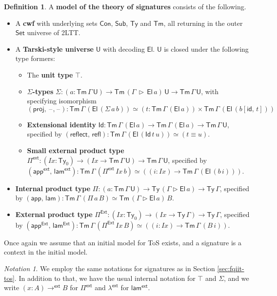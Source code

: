 \documentclass[12pt,a4paper,twoside,openany]{book}
\theoremstyle{remark}
\newtheorem{notation}{Notation}
\theoremstyle{definition}
\newtheorem{mydefinition}{Definition}
\theoremstyle{theorem}
\newcommand{\mi}[1]{\mathit{#1}}
\newcommand{\ms}[1]{\mathsf{#1}}
\newcommand{\refl}{\mathsf{refl}}
\newcommand{\reflect}{\mathsf{reflect}}
\newcommand{\id}{\mathsf{id}}
\newcommand{\Con}{\mathsf{Con}}
\newcommand{\Sub}{\mathsf{Sub}}
\newcommand{\Tm}{\mathsf{Tm}}
\newcommand{\Ty}{\mathsf{Ty}}
\newcommand{\U}{\mathsf{U}}
\newcommand{\El}{\mathsf{El}}
\newcommand{\Id}{\mathsf{Id}}
\newcommand{\proj}{\mathsf{proj}}
\newcommand{\blank}{\mathord{\hspace{1pt}\text{--}\hspace{1pt}}}
\newcommand{\Set}{\mathsf{Set}}
\newcommand{\ext}{\triangleright}
\newcommand{\Pie}{\Pi^{\mathsf{Ext}}}
\newcommand{\appe}{\mathsf{app^{Ext}}}
\newcommand{\lame}{\mathsf{lam^{Ext}}}
\newcommand{\Piinf}{\Pi^{\mathsf{ext}}}
\newcommand{\appinf}{\mathsf{app^{ext}}}
\newcommand{\laminf}{\mathsf{lam^{ext}}}
\newcommand{\toinf}{\to^{\ms{ext}}}
\newcommand{\lambdainf}{\lambda^{\ms{ext}}}
\newcommand{\app}{\ms{app}}
\newcommand{\lam}{\ms{lam}}
\begin{document}
\begin{mydefinition}
\label{def:iqiit-tos}
A \textbf{model of the theory of signatures} consists of the following.
  \begin{itemize}
    \item A \textbf{cwf} with underlying sets $\Con$, $\Sub$, $\Ty$ and $\Tm$, all returning in
      the outer $\Set$ universe of 2LTT.
    \item A \textbf{Tarski-style universe} $\U$ with decoding $\El$. $\U$ is closed under the following type formers:
      \begin{itemize}
        \item The \textbf{unit type} $\top$.
        \item \textbf{$\Sigma$-types} $\Sigma : (a : \Tm\,\Gamma\,\U) \to \Tm\,(\Gamma\,\ext\,\El\,a)\,\U \to \Tm\,\Gamma\,\U$, with specifying isomorphism
          \[(\proj,\,\blank\!,\!\blank) : \Tm\,\Gamma\,(\El\,(\Sigma\,a\,b))\simeq (t : \Tm\,\Gamma\,(\El\,a)) \times \Tm\,\Gamma\,(\El\,(b[\id,\,t]))\]
        \item \textbf{Extensional identity} $\Id : \Tm\,\Gamma\,(\El\,a) \to \Tm\,\Gamma\,(\El\,a) \to \Tm\,\Gamma\,\U$,
          specified by $(\reflect,\,\refl) : \Tm\,\Gamma\,(\El\,(\Id\,t\,u)) \simeq (t \equiv u)$.
        \item \textbf{Small external product type} $\Piinf : (\mi{Ix} : \Ty_0) \to (\mi{Ix} \to \Tm\,\Gamma\,\U) \to \Tm\,\Gamma\,\U$, specified by $(\appinf,\,\laminf) : \Tm\,\Gamma\,(\Piinf\,\mi{Ix}\,b) \simeq ((i : \mi{Ix}) \to \Tm\,\Gamma\,(\El\,(b\,i)))$.
      \end{itemize}
    \item \textbf{Internal product type} $\Pi : (a : \Tm\,\Gamma\,\U) \to
      \Ty\,(\Gamma\ext\El\,a) \to \Ty\,\Gamma$, specified by
      $(\app,\,\lam) : \Tm\,\Gamma\,(\Pi\,a\,B) \simeq \Tm\,(\Gamma \ext \El\,a)\,B$.
    \item \textbf{External product type} $\Pie : (\mi{Ix} : \Ty_0) \to (\mi{Ix} \to \Ty\,\Gamma) \to \Ty\,\Gamma$, specified by
      $(\appe,\,\lame) : \Tm\,\Gamma\,(\Pie\,\mi{Ix}\,B) \simeq ((i : \mi{Ix}) \to \Tm\,\Gamma\,(B\,i))$.
  \end{itemize}
\end{mydefinition}
Once again we assume that an initial model for ToS exists, and a signature is a
context in the initial model.

\begin{notation}
  We employ the same notations for signatures as in Section \ref{sec:fqiit-tos}. In addition to that,
  we have the usual internal notation for $\top$ and $\Sigma$, and we write $(x : A) \toinf B$ for $\Piinf$
  and $\lambdainf$ for $\laminf$.
\end{notation}
\end{document}
